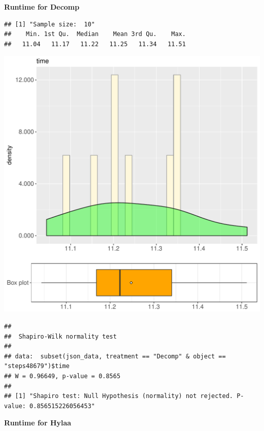 \documentclass{article}\usepackage[]{graphicx}\usepackage[]{color}
\makeatletter
\def\maxwidth{ %
  \ifdim\Gin@nat@width>\linewidth
    \linewidth
  \else
    \Gin@nat@width
  \fi
}
\newenvironment{kframe}{%
 \def\at@end@of@kframe{}%
 \ifinner\ifhmode%
  \def\at@end@of@kframe{\end{minipage}}%
  \begin{minipage}{\columnwidth}%
 \fi\fi%
 \def\FrameCommand##1{\hskip\@totalleftmargin \hskip-\fboxsep
 \colorbox{shadecolor}{##1}\hskip-\fboxsep
     \hskip-\linewidth \hskip-\@totalleftmargin \hskip\columnwidth}%
 \MakeFramed {\advance\hsize-\width
   \@totalleftmargin\z@ \linewidth\hsize
   \@setminipage}}%
 {\par\unskip\endMakeFramed%
 \at@end@of@kframe}
\newenvironment{knitrout}{}{} %
\makeatother
\begin{document}
 \textbf{Runtime for Decomp}
\begin{knitrout}
\color{fgcolor}\begin{kframe}
\begin{verbatim}
## [1] "Sample size:  10"
##    Min. 1st Qu.  Median    Mean 3rd Qu.    Max. 
##   11.04   11.17   11.22   11.25   11.34   11.51
\end{verbatim}
\end{kframe}
\includegraphics[width=\maxwidth]{figure/RH2_Decomp_steps48679-1} 
\begin{kframe}\begin{verbatim}
## 
## 	Shapiro-Wilk normality test
## 
## data:  subset(json_data, treatment == "Decomp" & object == "steps48679")$time
## W = 0.96649, p-value = 0.8565
## 
## [1] "Shapiro test: Null Hypothesis (normality) not rejected. P-value: 0.856515226056453"
\end{verbatim}
\end{kframe}
\end{knitrout}
 \textbf{Runtime for Hylaa}
\end{document}
